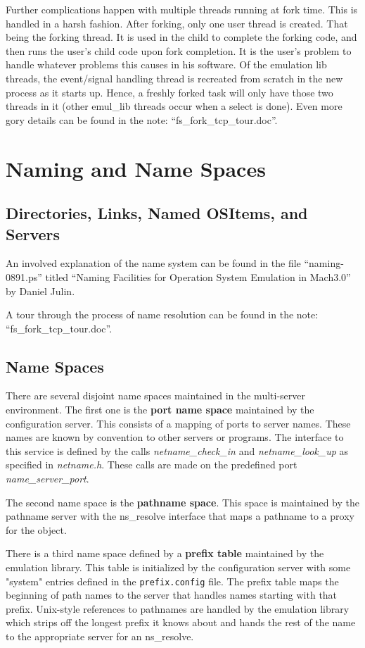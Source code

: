 Further complications happen with multiple threads running at fork time.
This is handled in a harsh fashion.  After forking, only one user thread
is created.  That being the forking thread.  It is used in the child to
complete the forking code, and then runs the user's child code upon
fork completion.  It is the user's problem to
handle whatever problems this causes in his software.  Of the emulation lib
threads, the event/signal handling thread is recreated from scratch in the
new process as it starts up.  Hence, a freshly forked task will only have
those two threads in it (other emul\_lib threads occur when a select is done).
Even more gory details can be found in the note: ``fs\_fork\_tcp\_tour.doc''.

\section{Naming and Name Spaces}
\label{sec:naming}
\subsection{Directories, Links, Named OSItems, and Servers}
An involved explanation of the name system can be found
in the file ``naming-0891.ps'' titled
``Naming Facilities for Operation System Emulation in Mach3.0''
by Daniel Julin.

A tour through the process of name resolution
can be found in the note: ``fs\_fork\_tcp\_tour.doc''.
{\MORE}

\subsection{Name Spaces}
There are several disjoint name spaces maintained in the multi-server
environment.  The first one is the {\bf port name space} maintained by
the configuration server. This consists of a mapping of ports 
to server names. These names are known by convention to other servers or programs.
The interface to this service is defined by the calls {\em netname\_check\_in}
and {\em netname\_look\_up} as specified in {\em netname.h}.
These calls are made on
the predefined port {\em name\_server\_port}.

The second name space is the {\bf pathname space}. This
space is maintained by the pathname server with the ns\_resolve interface that
maps a pathname to a proxy for the object. 

There is a third name space defined by a {\bf prefix table} maintained by the
emulation library. This table is initialized by the configuration server with some 
"system" entries defined in the \verb|prefix.config| file. The prefix table maps the beginning
of path names to the server that handles names starting with that prefix.
Unix-style references to pathnames are handled by the emulation
library which strips off the longest prefix it knows about and hands
the rest of the name to the appropriate server for an ns\_resolve.

